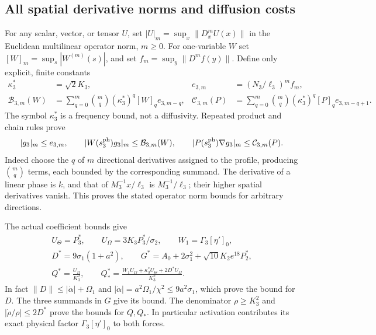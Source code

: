 \subsection{All spatial derivative norms and diffusion costs}

For any scalar, vector, or tensor $U$, set
$|U|_m=\sup_x\|D_x^mU(x)\|$ in the Euclidean multilinear
operator norm, $m\geq0$. For one-variable $W$ set
$[W]_m=\sup_s|W^{(m)}(s)|$, and set
$f_m=\sup_y\|D^mf(y)\|$.
Define only explicit, finite constants
\begin{align}
 \kappa_3^*&=\sqrt2K_3,&
 e_{3,m}&=(N_3/\ell_3)^mf_m,\nonumber\\
 \mathcal B_{3,m}(W)&=\sum_{q=0}^m\binom mq
                (\kappa_3^*)^q[W]_qe_{3,m-q},&
 \mathcal C_{3,m}(P)&=\sum_{q=0}^m\binom mq
                (\kappa_3^*)^q[P]_qe_{3,m-q+1}.
 \label{cvlane:tgs:normdefinitions}
\end{align}
The symbol $\kappa_3^*$ is a frequency bound, not a diffusivity.
Repeated product and chain rules prove
\[
 |g_3|_m\leq e_{3,m},\qquad
 |W(s_3^{\rm ph})g_3|_m\leq\mathcal B_{3,m}(W),\qquad
 |P(s_3^{\rm ph})\nabla g_3|_m\leq\mathcal C_{3,m}(P).
\]
Indeed choose the $q$ of $m$ directional derivatives assigned to
the profile, producing $\binom mq$ terms, each bounded by the
corresponding summand. The derivative of a linear phase is $k$,
and that of $M_3^{-1}x/\ell_3$ is $M_3^{-1}/\ell_3$;
their higher spatial derivatives vanish. This proves the stated
operator norm bounds for arbitrary directions.

The actual coefficient bounds give
\begin{equation}\label{cvlane:tgs:coefficientbounds}
 \begin{gathered}
 U_\Theta=P_3^*,\qquad U_\Omega=3K_3P_3^*/\sigma_2,
 \qquad W_1=\Gamma_3[\eta']_0,\\
 D^*=9\sigma_1(1+a^2),\qquad
 G^*=A_0+2\sigma_1^2+\sqrt{10}K_2e^{18}P_2^*,\\
 Q^*=\frac{U_\Omega}{K_3^2},\qquad
 Q_*^*=\frac{W_1U_\Omega+\kappa_3^*U_\Theta+2D^*U_\Omega}{K_3^2}.
 \end{gathered}
\end{equation}
In fact $\|D\|\leq|\dot\alpha|+\Omega_1$ and
$|\dot\alpha|=a^2\Omega_1/\chi^2\leq9a^2\sigma_1$,
which prove the bound for $D$. The three summands in $G$
give its bound. The denominator $\rho\geq K_3^2$ and
$|\dot\rho/\rho|\leq2D^*$ prove the bounds for $Q,Q_*$.
In particular activation contributes its exact physical factor
$\Gamma_3[\eta']_0$ to both forces.

